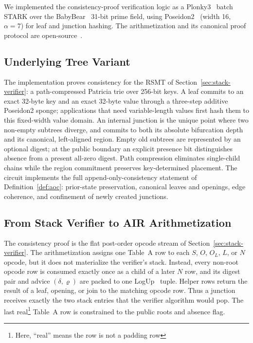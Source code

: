 \documentclass[11pt]{article}
\begin{document}
We implemented the consistency-proof verification logic as a Plonky3~\cite{plonky3} batch STARK over the BabyBear~\cite{babybear} 31-bit prime field, using Poseidon2~\cite{cryptoeprint:2023/323} (width 16, $\alpha=7$) for leaf and junction hashing. The arithmetization and its canonical proof protocol are open-source~\cite{rsmtair}.

\subsection{Underlying Tree Variant}

The implementation proves consistency for the RSMT of Section~\ref{sec:stack-verifier}: a path-compressed Patricia trie over 256-bit keys. A leaf commits to an exact 32-byte key and an exact 32-byte value through a three-step additive Poseidon2 sponge; applications that need variable-length values first hash them to this fixed-width value domain. An internal junction is the unique point where two non-empty subtrees diverge, and commits to both its absolute bifurcation depth and its canonical, left-aligned region. Empty old subtrees are represented by an optional digest; at the public boundary an explicit presence bit distinguishes absence from a present all-zero digest. Path compression eliminates single-child chains while the region commitment preserves key-determined placement. The circuit implements the full append-only-consistency statement of Definition~\ref{def:aoc}: prior-state preservation, canonical leaves and openings, edge coherence, and confinement of newly created junctions.

\subsection{From Stack Verifier to AIR Arithmetization}

The consistency proof is the flat post-order opcode stream of Section~\ref{sec:stack-verifier}. The arithmetization assigns one Table~A row to each $S$, $O$, $O_L$, $L$, or $N$ opcode, but it does not materialize the verifier's stack. Instead, every non-root opcode row is consumed exactly once as a child of a later $N$ row, and its digest pair and advice $(\delta,\varrho)$ are packed to one LogUp~\cite{cryptoeprint:2022/1530} tuple. Helper rows return the result of a leaf, opening, or join to the matching opcode row. Thus a junction receives exactly the two stack entries that the verifier algorithm would pop. The last real\footnote{Here, ``real'' means the row is not a padding row} Table~A row is constrained to the public roots and absence flag.
\end{document}
